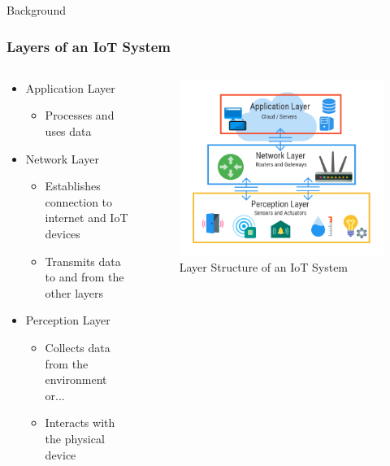 \documentclass{beamer}
\begin{document}
\begin{frame}{Background}
  \frametitle{Layers of an IoT System}
  \begin{columns}
    \begin{column}{0.6\textwidth}
      \begin{itemize}
        \item Application Layer
          \begin{itemize}
            \item Processes and uses data
          \end{itemize}
        \item Network Layer
          \begin{itemize}
            \item Establishes connection to internet and IoT devices
            \item Transmits data to and from the other layers
          \end{itemize}
        \item Perception Layer
          \begin{itemize}
            \item Collects data from the environment or...
            \item Interacts with the physical device
          \end{itemize}
      \end{itemize}
    \end{column}
    \begin{column}{0.4\textwidth}
      \begin{figure}[htbp]
        \centering
        \includegraphics[width=\textwidth]{images/three-layer-iot-architecture.png}
        \caption{Layer Structure of an IoT System \cite{Calihman_2021}}
        \label{fig:IoT_Layers}
      \end{figure}
  \end{column}
  \end{columns}
\end{frame}
\end{document}
